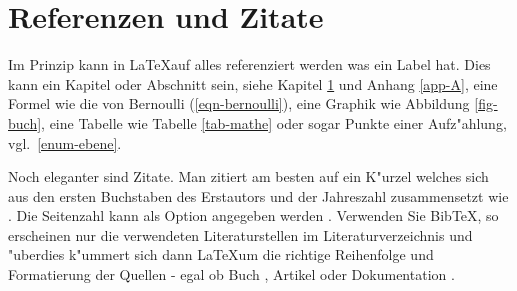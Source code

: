 \chapter{Referenzen und Zitate}\label{cha-ref}

Im Prinzip kann in \LaTeX auf alles referenziert werden was ein Label hat. Dies kann ein Kapitel oder Abschnitt sein, siehe Kapitel \ref{cha-ref} und Anhang \ref{app-A}, eine Formel wie die von Bernoulli (\ref{eqn-bernoulli}), eine Graphik wie Abbildung \ref{fig-buch}, eine Tabelle wie Tabelle \ref{tab-mathe} oder sogar Punkte einer Aufz"ahlung, vgl.~\ref{enum-ebene}.

Noch eleganter sind Zitate. Man zitiert am besten auf ein K"urzel welches sich aus den ersten Buchstaben des Erstautors und der Jahreszahl zusammensetzt wie \cite{sch04}. Die Seitenzahl kann als Option angegeben werden \cite[S.~30]{sch04}. Verwenden Sie BibTeX, so erscheinen nur die verwendeten Literaturstellen im Literaturverzeichnis und "uberdies k"ummert sich dann \LaTeX um die richtige Reihenfolge und Formatierung der Quellen - egal ob Buch \cite{sch04}, Artikel \cite{kat06} oder Dokumentation \cite{meh10}.
